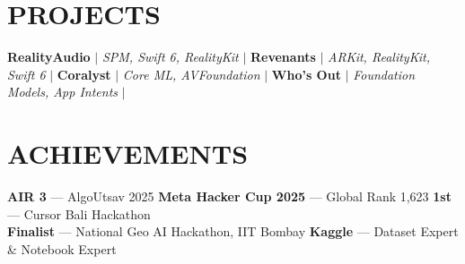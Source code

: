 \section{PROJECTS}
    \resumeSubHeadingListStart
        \resumeProjectHeading
          {\textbf{RealityAudio} $|$ \emph{SPM, Swift 6, RealityKit} $|$ \href{https://github.com/bhanage-viraj/RealityAudio}{}}{}
          \resumeItemListStart
          \resumeItemListEnd
        \resumeProjectHeading
          {\textbf{Revenants} $|$ \emph{ARKit, RealityKit, Swift 6} $|$ \href{https://github.com/bhanage-viraj/Split-Mechanics}{} \hspace{2pt} \href{https://testflight.apple.com/join/bxqH2nP9}{}}{}
          \resumeItemListStart
          \resumeItemListEnd
        \resumeProjectHeading
          {\textbf{Coralyst} $|$ \emph{Core ML, AVFoundation} $|$ \href{https://github.com/Gleenryan/CH5_Biorocks}{}}{}
          \resumeItemListStart
          \resumeItemListEnd
        \resumeProjectHeading
          {\textbf{Who's Out} $|$ \emph{Foundation Models, App Intents} $|$ \href{https://github.com/bhanage-viraj/Whos-Out}{} \hspace{2pt} \href{https://testflight.apple.com/join/avevSG7f}{}}{}
          \resumeItemListStart
          \resumeItemListEnd
    \resumeSubHeadingListEnd

\section{ACHIEVEMENTS}
 \begin{itemize}[leftmargin=0in, label={}, itemsep=0pt, topsep=1pt]
    \small{\item{
     \textbf{AIR 3} --- AlgoUtsav 2025 \hspace{8pt} \textbf{Meta Hacker Cup 2025} --- Global Rank 1,623 \hspace{8pt} \textbf{1st} --- Cursor Bali Hackathon \\
     \textbf{Finalist} --- National Geo AI Hackathon, IIT Bombay \hspace{8pt} \textbf{Kaggle} --- Dataset Expert \& Notebook Expert
    }}
 \end{itemize}


